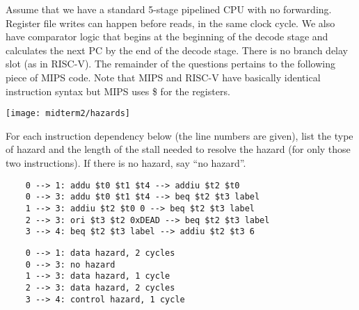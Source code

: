 \begin{blocksection}
Assume that we have a standard 5-stage pipelined CPU with no forwarding. Register file writes can happen before reads, in the same clock cycle. We also have comparator logic that begins at the beginning of the decode stage and calculates the next PC by the end of the decode stage. There is no branch delay slot (as in RISC-V). The remainder of the questions pertains to the following piece of MIPS code. Note that MIPS and RISC-V have basically identical instruction syntax but MIPS uses \$ for the registers.

\texttt{[image: midterm2/hazards]}

\question
For each instruction dependency below (the line numbers are given), list the type of hazard and the length of the stall needed to resolve the hazard (for only those two instructions). If there is no hazard, say “no hazard”.
\begin{verbatim}
    0 --> 1: addu $t0 $t1 $t4 --> addiu $t2 $t0
    0 --> 3: addu $t0 $t1 $t4 --> beq $t2 $t3 label
    1 --> 3: addiu $t2 $t0 0 --> beq $t2 $t3 label
    2 --> 3: ori $t3 $t2 0xDEAD --> beq $t2 $t3 label
    3 --> 4: beq $t2 $t3 label --> addiu $t2 $t3 6
\end{verbatim}
\begin{solution}
    \begin{verbatim}
    0 --> 1: data hazard, 2 cycles
    0 --> 3: no hazard
    1 --> 3: data hazard, 1 cycle
    2 --> 3: data hazard, 2 cycles
    3 --> 4: control hazard, 1 cycle
    \end{verbatim}
\end{solution}


\end{blocksection}